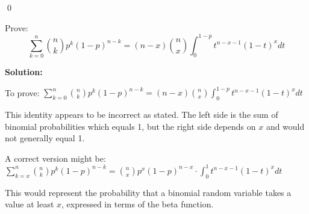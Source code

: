 \qed
\begin{problembox}
Prove:
\[ \sum_{k=0}^n \binom{n}{k}p^k(1-p)^{n-k} = (n-x)\binom{n}{x}\int_0^{1-p} t^{n-x-1}(1-t)^x dt \]
\end{problembox}

\noindent\textbf{Solution:}

To prove: $\sum_{k=0}^n \binom{n}{k}p^k(1-p)^{n-k} = (n-x)\binom{n}{x}\int_0^{1-p} t^{n-x-1}(1-t)^x dt$

This identity appears to be incorrect as stated. The left side is the sum of binomial probabilities which equals 1, but the right side depends on $x$ and would not generally equal 1.

A correct version might be:
$\sum_{k=x}^n \binom{n}{k}p^k(1-p)^{n-k} = \binom{n}{x}p^x(1-p)^{n-x} \cdot \int_0^1 t^{n-x-1}(1-t)^x dt$

This would represent the probability that a binomial random variable takes a value at least $x$, expressed in terms of the beta function.
